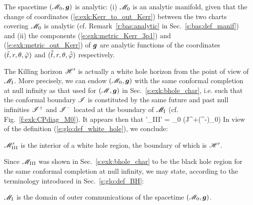 \begin{remark} \label{r:exk:M0_analytic}
The spacetime $(\mathscr{M}_0,\bm{g})$ is analytic: (i) $\mathscr{M}_0$ is an analytic manifold,
given that the change of coordinates (\ref{e:exk:Kerr_to_out_Kerr})
between the two charts covering $\mathscr{M}_0$ is analytic
(cf. Remark~\ref{r:bas:analytic} in Sec.~\ref{s:bas:def_manif})
and (ii) the components (\ref{e:exk:metric_Kerr_3p1}) and (\ref{e:exk:metric_out_Kerr})
of $\bm{g}$ are analytic functions of the
coordinates $({\tilde t}, r, \theta, {\tilde\varphi})$ and $(\tilde{{\tilde t}}, r, \theta, \tilde{{\tilde\varphi}})$
respectively.
\end{remark}


The Killing horizon $\mathscr{H}'$ is actually a white hole horizon from the point
of view of $\mathscr{M}_{\rm I}$. More precisely, we can endow $(\mathscr{M}_0,\bm{g})$ with the same conformal
completion at null infinity as that used for $(\mathscr{M},\bm{g})$ in Sec.~\ref{s:exk:bhole_char},
i.e. such that the conformal boundary $\mathscr{I}$ is constituted by
the same future and past null infinities
$\mathscr{I}^+$ and $\mathscr{I}^-$ located at the boundary of $\mathscr{M}_{\rm I}$ (cf. Fig.~\ref{f:exk:CPdiag_M0}).
It appears then that
\be
   \M'_{\rm III}\cup \Hor' = \M_0 \setminus (J^+(\scri^-)\cap \M_0)
\ee
In view of the definition (\ref{e:glo:def_white_hole}), we conclude:
\begin{prop}
$\mathscr{M}'_{\rm III}$ is the interior of a white hole region, the boundary of which
is $\mathscr{H}'$.
\end{prop}

Since $\mathscr{M}_{\rm III}$ was shown in Sec.~\ref{s:exk:bhole_char} to be the black hole region for
the same conformal completion at null infinity, we may state,
according to the terminology introduced in Sec.~\ref{s:glo:def_BH}:
\begin{prop}
$\mathscr{M}_{\rm I}$ is the domain of outer communications
of the spacetime $(\mathscr{M}_0,\bm{g})$.
\end{prop}


